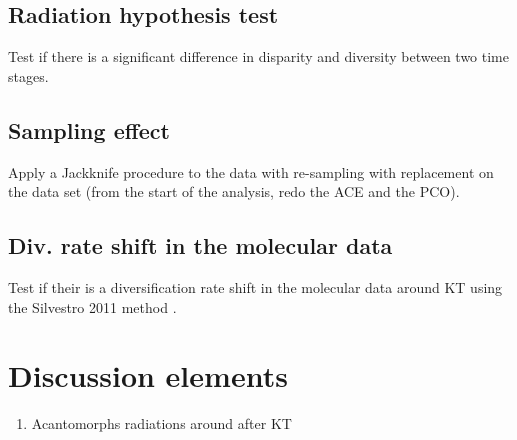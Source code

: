 \documentclass[a4paper,11pt]{article}
\begin{document}
\subsection{Radiation hypothesis test}
Test if there is a significant difference in disparity and diversity between two time stages.
\subsection{Sampling effect}
Apply a Jackknife procedure to the data with re-sampling with replacement on the data set (from the start of the analysis, redo the ACE and the PCO).
\subsection{Div. rate shift in the molecular data}
Test if their is a diversification rate shift in the molecular data around KT using the Silvestro 2011 method \citep{silvestroa2011}.

\section{Discussion elements}
\begin{enumerate}
\item{Acantomorphs radiations around after KT \citep{friedmanexplosive2010}}
\end{enumerate}





\end{document}
